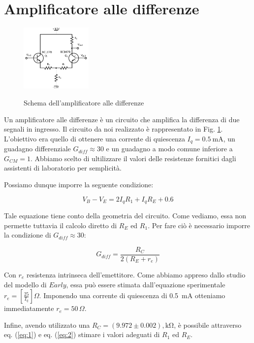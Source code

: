 \section{Amplificatore alle differenze}
\begin{figure}
	\caption{Schema dell'amplificatore alle differenze}
	\includegraphics[width=35mm]{cc1.pdf}
	\label{fig:cc1}
\end{figure}

Un amplificatore alle differenze è un circuito che amplifica la differenza di due segnali in ingresso. 
Il circuito da noi realizzato è rappresentato in Fig. \ref{fig:cc1}.
L'obiettivo era quello di ottenere una corrente di quiescenza $I_q=\SI{0.5}{\milli\ampere}$, un guadagno differenziale $G_{diff}\approx 30$ e un guadagno a modo comune inferiore a $G_{CM} = 1$.
Abbiamo scelto di ultilizzare il valori delle resistenze fornitici dagli assistenti di laboratorio per semplicità.

Possiamo dunque imporre la seguente condizione:

\begin{equation}
V_B-V_E=2I_q R_1 + I_q R_E + 0.6
\label{eq:1}
\end{equation}

Tale equazione tiene conto della geometria del circuito.
Come vediamo, essa non permette tuttavia il calcolo diretto di $R_E$ ed $R_1$.
Per fare ciò è necessario imporre la condizione di $G_{diff} \approx 30$:

\begin{equation}
G_{diff}=\frac{R_C}{2(R_E+r_e)}
\label{eq:2}
\end{equation}

Con $r_e$ resistenza intrinseca dell'emettitore.
Come abbiamo appreso dallo studio del modello di $Early$, essa può essere stimata dall'equazione sperimentale $r_e = \left[ \frac{25}{I_q} \right] \Omega$.
Imponendo una corrente di quiescenza di \SI{0.5}{\milli\ampere} otteniamo immediatamente $r_e = 50\, \Omega$. 

Infine, avendo utilizzato una $R_C=(9.972\pm0.002),\si{\kilo\ohm}$, è possibile attraverso eq. (\ref{eq:1}) e eq. (\ref{eq:2}) stimare i valori adeguati di $R_1$ ed $R_E$. 

